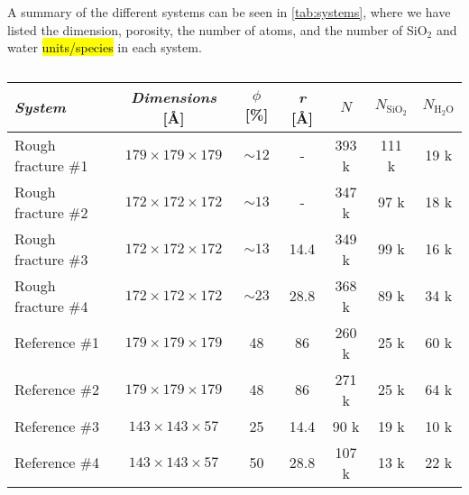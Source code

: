 A summary of the different systems can be seen in \cref{tab:systems}, where we have listed the dimension, porosity, the number of atoms, and the number of SiO$_2$ and water \hl{units/species} in each system.
%
\begin{table}[htpb]
\centering
    \begin{tabular}{l|cccccc}
    \textit{System}             & \textit{Dimensions} [\AA]     & $\phi$ [\%]   & \textit{r} [\AA]  & $N$       & $N_\text{SiO$_2$}$    & $N_\text{H$_2$O}$ \\ \hline 
    Rough fracture \#1          & $179 \times 179 \times 179$   & ${\sim}12$    & -                 & 393 k  & 111 k                    & 19 k           \\ %
    Rough fracture \#2          & $172 \times 172 \times 172$   & ${\sim}13$    & -                 & 347 k  & 97 k                     & 18 k            \\ %
    Rough fracture \#3          & $172 \times 172 \times 172$   & ${\sim}13$    & 14.4              & 349 k  & 99 k                     & 16 k            \\ %
    Rough fracture \#4          & $172 \times 172 \times 172$   & ${\sim}23$    & 28.8              & 368 k  & 89 k                     & 34 k            \\ %
    \hline %
    Reference \#1           & $179 \times 179 \times 179$   & 48            & 86                & 260 k     & 25 k                  & 60 k                             \\ %
    Reference \#2           & $179 \times 179 \times 179$   & 48            & 86                & 271 k     & 25 k                  & 64 k                             \\ %
    Reference \#3           & $143 \times 143 \times 57$    & 25            & 14.4              & 90 k      & 19 k                  & 10 k                             \\ %
    Reference \#4           & $143 \times 143 \times 57$    & 50            & 28.8              & 107 k     & 13 k                  & 22 k                             \\ %
    \end{tabular}%
    \vspace{8pt}
    \caption{%
}
\end{table}
